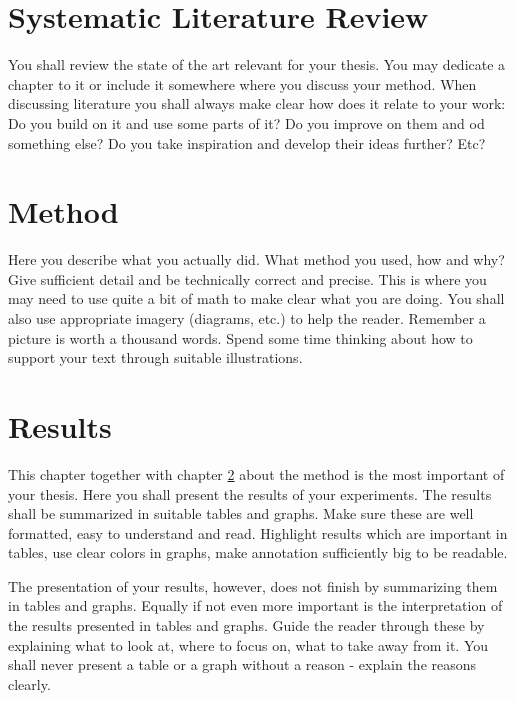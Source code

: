 
\chapter{Systematic Literature Review}\label{ch:SLR}

You shall review the state of the art relevant for your thesis. 
You may dedicate a chapter to it or include it somewhere where you discuss your method.
When discussing literature you shall always make clear how does it relate to your work:
Do you build on it and use some parts of it?
Do you improve on them and od something else?
Do you take inspiration and develop their ideas further?
Etc?

\chapter{Method}\label{ch:Method}

Here you describe what you actually did.
What method you used, how and why?
Give sufficient detail and be technically correct and precise.
This is where you may need to use quite a bit of math to make clear what you are doing.
You shall also use appropriate imagery (diagrams, etc.) to help the reader.
Remember a picture is worth a thousand words.
Spend some time thinking about how to support your text through suitable illustrations.

\chapter{Results}\label{ch:Results}

This chapter together with chapter \ref{ch:Method} about the method is the most important of your thesis.
Here you shall present the results of your experiments. 
The results shall be summarized in suitable tables and graphs. 
Make sure these are well formatted, easy to understand and read. 
Highlight results which are important in tables, use clear colors in graphs, make annotation sufficiently big to be readable. 

The presentation of your results, however, does not finish by summarizing them in tables and graphs.
Equally if not even more important is the interpretation of the results presented in tables and graphs.
Guide the reader through these by explaining what to look at, where to focus on, what to take away from it.
You shall never present a table or a graph without a reason - explain the reasons clearly.

